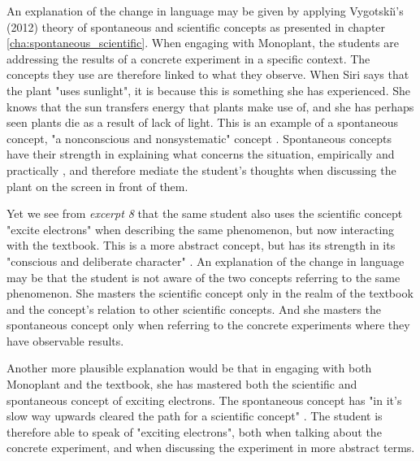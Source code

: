 An explanation of the change in language may be given by applying Vygotski{\u\i}'s (2012) theory of spontaneous and scientific concepts as presented in chapter \ref{cha:spontaneous_scientific}. When engaging with Monoplant, the students are addressing the results of a concrete experiment in a specific context. The concepts they use are therefore linked to what they observe. When Siri says that the plant "uses sunlight", it is because this is something she has experienced. She knows that the sun transfers energy that plants make use of, and she has perhaps seen plants die as a result of lack of light. This is an example of a spontaneous concept, "a nonconscious and nonsystematic" concept \citep{vygotsky2012thought}. Spontaneous concepts have their strength in explaining what concerns the situation, empirically and practically \citep{vygotsky2012thought}, and  therefore mediate the student's thoughts when discussing the plant on the screen in front of them. 


Yet we see from \emph{excerpt 8} that the same student also uses the scientific concept "excite electrons" when describing the same phenomenon, but now interacting with the textbook. This is a more abstract concept, but has its strength in its "conscious and deliberate character" \citep{vygotsky2012thought}. An explanation of the change in language may be that the student is not aware of the two concepts referring to the same phenomenon. She masters the scientific concept only in the realm of the textbook and the concept's relation to other scientific concepts. And she masters the spontaneous concept only when referring to the concrete experiments where they have observable results. 

Another more plausible explanation would be that in engaging with both Monoplant and the textbook, she has mastered both the scientific and spontaneous concept of exciting electrons. The spontaneous concept has "in it's slow way upwards cleared the path for a scientific concept" \citep{vygotsky2012thought}. The student is therefore able to speak of "exciting electrons", both when talking about the concrete experiment, and when discussing the experiment in more abstract terms. 

